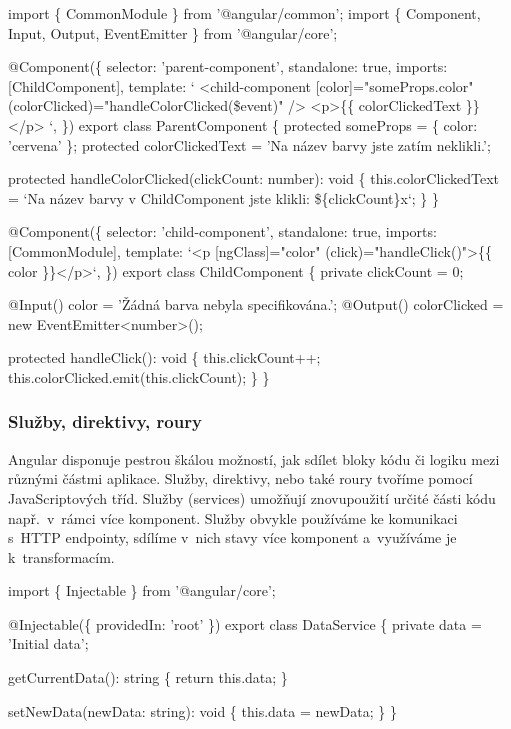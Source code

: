 \begin{prog}
import \{ CommonModule \} from '@angular/common';
import \{ Component, Input, Output, EventEmitter \} from '@angular/core';

@Component(\{
  selector: 'parent-component',
  standalone: true,
  imports: [ChildComponent],
  template: `
    <child-component 
      [color]="someProps.color" 
      (colorClicked)="handleColorClicked(\$event)" 
    />
    <p>\{\{ colorClickedText \}\}</p>
  `,
\})
export class ParentComponent \{
  protected someProps = \{ color: 'cervena' \};
  protected colorClickedText = 'Na název barvy jste zatím neklikli.';

  protected handleColorClicked(clickCount: number): void \{
    this.colorClickedText = `Na název barvy 
      v ChildComponent jste klikli: \$\{clickCount\}x`;
  \}
\}

@Component(\{
  selector: 'child-component',
  standalone: true,
  imports: [CommonModule],
  template: `<p [ngClass]="color" (click)="handleClick()">\{\{ color \}\}</p>`,
\})
export class ChildComponent \{
  private clickCount = 0;

  @Input() color = 'Žádná barva nebyla specifikována.';
  @Output() colorClicked = new EventEmitter<number>();

  protected handleClick(): void \{
    this.clickCount++;
    this.colorClicked.emit(this.clickCount);
  \}
\}
\end{prog}

\subsubsection{Služby, direktivy, roury}

Angular disponuje pestrou škálou možností, jak sdílet bloky kódu či logiku mezi různými částmi aplikace. Služby, direktivy, nebo také roury tvoříme pomocí JavaScriptových tříd. 
Služby (services) umožňují znovupoužití určité části kódu např.~v~rámci více komponent. 
Služby obvykle používáme ke komunikaci s~HTTP endpointy, sdílíme v~nich stavy více komponent a~využíváme je k~transformacím.\cite{angulardev,learningangular}

\begin{prog}
import \{ Injectable \} from '@angular/core';
  
@Injectable(\{ providedIn: 'root' \})
export class DataService \{
  private data = 'Initial data';

  getCurrentData(): string \{
    return this.data;
  \}
      
  setNewData(newData: string): void \{
    this.data = newData;
  \}
\}
\end{prog}

